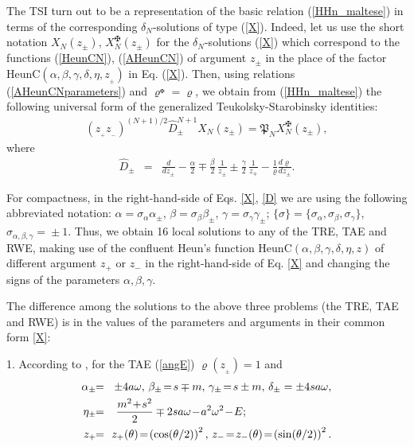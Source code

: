 \documentclass[prd,aps,twocolumn,leterpaper,preprintnumbers]{revtex4}
\numberwithin{equation}{section}
\newcommand{\ben}{\begin{eqnarray}}
\newcommand{\een}{\end{eqnarray}}
\newcommand{\la}{\label}
\begin{document}
The TSI turn out to be a representation of the basic relation (\ref{HHn_maltese})
in terms of the corresponding $\delta_N$-solutions of type (\ref{X}).
Indeed, let us use the short notation $X_N(z_\pm)$, $X^\maltese_N(z_\pm)$
for the $\delta_N$-solutions (\ref{X}) which correspond to the functions
(\ref{HeunCN}), (\ref{AHeunCN}) of argument $z_\pm$ in the place of the factor
$\text{HeunC}(\alpha,\beta,\gamma,\delta,\eta, z_{{}_\pm})$ in Eq. (\ref{X}).
Then, using relations (\ref{AHeunCNparameters})
and $\varrho^{{}_\maltese}=\varrho$,
we obtain from (\ref{HHn_maltese}) the following universal
form of the generalized Teukolsky-Starobinsky identities:
%
\ben
\la{TSIXN}
\left(z_{{}_{+}}z_{{}_{-}}\right)^{(N+1)/2}\hat D_\pm^{N+1}X_N(z_\pm)=\mathfrak{P}_N X^\maltese_N(z_\pm),
\een
%
where
%
\ben
\la{D}
\hat D_\pm\!&=&\!{\frac{d}{dz_\pm}}-{\frac{\alpha}{2}}\mp{\frac{\beta}{2}}\,{\frac{1}{z_\pm}}\pm
{\frac{\gamma}{2}}\,{\frac{1}{z_\mp}}-{\frac{1}{\varrho}}{\frac{d\varrho}{dz_\pm}}.
\een

For compactness, in the right-hand-side of Eqs. \eqref{X}, \eqref{D}
we are using the following abbreviated notation:
$\alpha\!=\!\sigma_\alpha\alpha_\pm$, $\beta\!=\!\sigma_\beta\beta_\pm$, $\gamma\!=\!\sigma_\gamma\gamma_\pm$;
$\{\sigma\}\!=\!\{\sigma_\alpha,\sigma_\beta,\sigma_\gamma\}$, $\sigma_{\alpha,\beta,\gamma}\!=\!\pm 1$.
%
Thus, we obtain 16 local solutions to any of the TRE, TAE and RWE,
making use of the confluent Heun's function $\text{HeunC}(\alpha,\beta,\gamma,\delta,\eta, z)$
of different argument $z_{+}$ or $z_{-}$ in the right-hand-side of Eq. \eqref{X} and
changing the signs of the parameters $\alpha,\beta,\gamma$.


The difference among the solutions to the above three problems (the TRE, TAE and RWE)
is in the values of the parameters and arguments in their common form \eqref{X}:

1. According to  \cite{Fiziev1}, for the TAE (\ref{angE}) $\varrho(z_{{}_\pm})\!=\!1$ and
%
\ben
\label{TAEparameters}
\alpha_{\pm}\!&\!=\!&\!\pm 4a\omega,\,\beta_{\pm}\!=\!s\mp m,\,\gamma_{\pm}\!=\!s\pm m,\,\delta_{\pm}=\pm 4s a\omega,\nonumber \\
\eta_{\pm}\!&\!=\!&\!{\frac{m^2\!+\!s^2}{2}}\mp 2s a\omega\!-\!a^2\omega^2\!-\!E;\hskip 2.7truecm \\
z_{+}\!&\!=\!&\!z_{+}(\theta)\!=\!\left(\cos(\theta/2)\right)^2,\, z_{-}\!=\!z_{-}(\theta)\!=\!\left(\sin(\theta/2)\right)^2.\nonumber
\een
%
\end{document}
